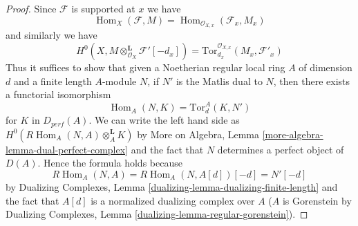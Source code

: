 \documentclass{stacks-project}
\theoremstyle{plain}
\theoremstyle{definition}
\theoremstyle{remark}
\numberwithin{equation}{subsection}
\def\Hom{\mathop{\mathrm{Hom}}\nolimits}
\begin{document}
\begin{proof}
Since $\mathcal{F}$ is supported at $x$ we have
$$
\Hom_X(\mathcal{F}, M) =
\Hom_{\mathcal{O}_{X, x}}(\mathcal{F}_x, M_x)
$$
and similarly we have
$$
H^0(X, M \otimes_{\mathcal{O}_X}^\mathbf{L} \mathcal{F}'[-d_x]) =
\text{Tor}^{\mathcal{O}_{X, x}}_{d_x}(M_x, \mathcal{F}'_x)
$$
Thus it suffices to show that given a Noetherian regular local ring $A$
of dimension $d$ and a finite length $A$-module $N$, if
$N'$ is the Matlis dual to $N$, then there exists a functorial isomorphism
$$
\Hom_A(N, K) = \text{Tor}^A_d(K, N')
$$
for $K$ in $D_{perf}(A)$. We can write the left hand side as
$H^0(R\Hom_A(N, A) \otimes_A^\mathbf{L} K)$ by
More on Algebra, Lemma \ref{more-algebra-lemma-dual-perfect-complex}
and the fact that $N$ determines a perfect object of $D(A)$.
Hence the formula holds because
$$
R\Hom_A(N, A) = R\Hom_A(N, A[d])[-d] = N'[-d]
$$
by Dualizing Complexes, Lemma \ref{dualizing-lemma-dualizing-finite-length}
and the fact that $A[d]$ is a normalized dualizing complex over $A$
($A$ is Gorenstein by
Dualizing Complexes, Lemma \ref{dualizing-lemma-regular-gorenstein}).
\end{proof}
\end{document}
